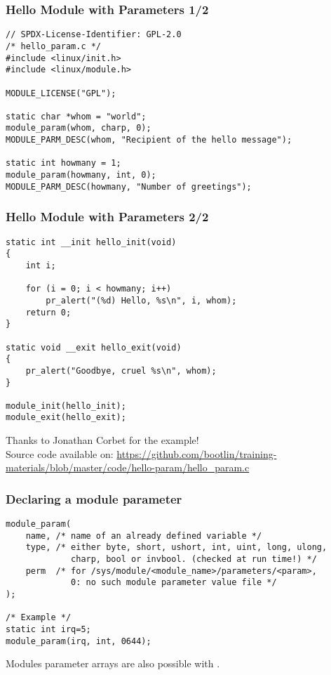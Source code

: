 \begin{frame}[fragile]
  \frametitle{Hello Module with Parameters 1/2}
\begin{verbatim}
// SPDX-License-Identifier: GPL-2.0
/* hello_param.c */
#include <linux/init.h>
#include <linux/module.h>

MODULE_LICENSE("GPL");

static char *whom = "world";
module_param(whom, charp, 0);
MODULE_PARM_DESC(whom, "Recipient of the hello message");

static int howmany = 1;
module_param(howmany, int, 0);
MODULE_PARM_DESC(howmany, "Number of greetings");
\end{verbatim}
\end{frame}

\begin{frame}[fragile]
  \frametitle{Hello Module with Parameters 2/2}
\begin{verbatim}
static int __init hello_init(void)
{
    int i;

    for (i = 0; i < howmany; i++)
        pr_alert("(%d) Hello, %s\n", i, whom);
    return 0;
}

static void __exit hello_exit(void)
{
    pr_alert("Goodbye, cruel %s\n", whom);
}

module_init(hello_init);
module_exit(hello_exit);
\end{verbatim}
Thanks to Jonathan Corbet for the example!\\
Source code available on: {\small
\url{https://github.com/bootlin/training-materials/blob/master/code/hello-param/hello_param.c}}
\end{frame}

\begin{frame}[fragile]
  \frametitle{Declaring a module parameter}

\begin{verbatim}
module_param(
    name, /* name of an already defined variable */
    type, /* either byte, short, ushort, int, uint, long, ulong,
             charp, bool or invbool. (checked at run time!) */
    perm  /* for /sys/module/<module_name>/parameters/<param>,
             0: no such module parameter value file */
);

/* Example */
static int irq=5;
module_param(irq, int, 0644);
\end{verbatim}
Modules parameter arrays are also possible with
.
\end{frame}
